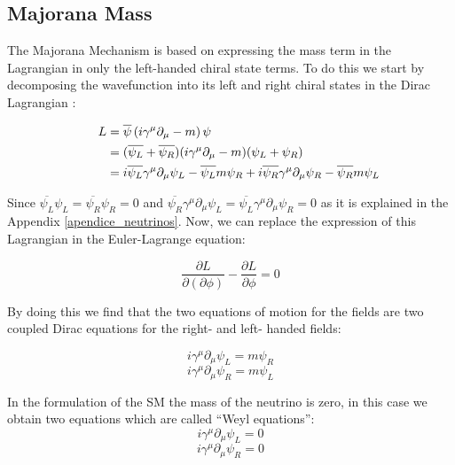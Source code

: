 \subsection{Majorana Mass}

The Majorana Mechanism is based on expressing the mass term in the Lagrangian in only the left-handed chiral state terms.
To do this we start by decomposing the wavefunction into its left and right chiral states in the Dirac Lagrangian \cite{Theory_neutrinos_book} :

\begin{align}
  \phantom{i = j = k}
  &\begin{aligned}
    \mathllap{L} &= \overline{\psi} \left( i \gamma ^\mu \partial_{\mu} - m \right) \psi \\
    \mathllap{}  &= (\overline{\psi_L} + \overline{\psi_R})( i \gamma ^\mu \partial_{\mu} - m)(\psi_L + \psi_R) \\
     \mathllap{} &= i \overline{\psi_L}\gamma^\mu\partial_\mu \psi_L - \overline{\psi_L} m \psi_R +
     i\overline{\psi_R}\gamma^\mu \partial_\mu \psi_R - \overline{\psi_R}m\psi_L
   &\end{aligned}
\end{align}

Since $\overline{\psi_L}\psi_L = \overline{\psi_R}\psi_R = 0$ and $\overline{\psi_R}\gamma^\mu \partial_\mu \psi_L = \overline{\psi_L}\gamma^\mu\partial_\mu \psi_R = 0$
as it is explained in the Appendix \ref{apendice_neutrinos}. Now, we can replace the expression of this Lagrangian in the Euler-Lagrange equation:

\begin{equation}
\frac{\partial L}{\partial (\partial \phi)} - \frac{\partial L}{\partial \phi} = 0
\end{equation}

By doing this we find that the two equations of motion for the fields are two coupled Dirac equations for the right- and left- handed fields:

\begin{equation}\label{majorana_objetive}
i \gamma ^\mu \partial_\mu \psi_L = m \psi_R
\end{equation} 
\begin{equation}\label{majorana_start}
i \gamma ^\mu \partial_\mu \psi_R = m \psi_L
\end{equation} 

In the formulation of the SM the mass of the neutrino is zero, in this case we obtain two equations which are called ``Weyl equations'':
\begin{equation}
i \gamma ^\mu \partial_\mu \psi_L = 0
\end{equation}
\begin{equation}
i \gamma ^\mu \partial_\mu \psi_R = 0
\end{equation}

